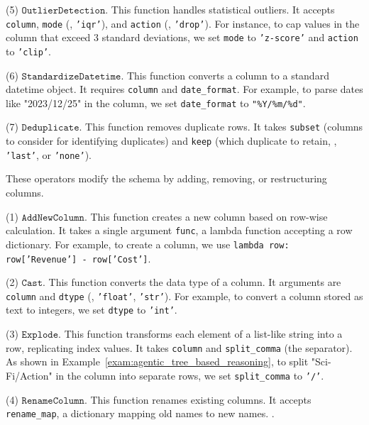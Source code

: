 (5) $\mathtt{OutlierDetection}$.
    This function handles statistical outliers. It accepts {\small\texttt{column}}, {\small\texttt{mode}} (, {\small\texttt{'iqr'}}), and {\small\texttt{action}} (, {\small\texttt{'drop'}}). For instance, to cap values in the  column that exceed 3 standard deviations, we set {\small\texttt{mode}} to {\small\texttt{'z-score'}} and {\small\texttt{action}} to {\small\texttt{'clip'}}.

(6) $\mathtt{StandardizeDatetime}$.
    This function converts a column to a standard datetime object. It requires {\small\texttt{column}} and {\small\texttt{date\_format}}. For example, to parse dates like "2023/12/25" in the  column, we set {\small\texttt{date\_format}} to {\small\texttt{"\%Y/\%m/\%d"}}.

(7) $\mathtt{Deduplicate}$.
    This function removes duplicate rows. It takes {\small\texttt{subset}} (columns to consider for identifying duplicates) and {\small\texttt{keep}} (which duplicate to retain, , {\small\texttt{'last'}}, or {\small\texttt{'none'}}).

These operators modify the schema by adding, removing, or restructuring columns.

(1) $\mathtt{AddNewColumn}$.
    This function creates a new column based on row-wise calculation. It takes a single argument {\small\texttt{func}}, a lambda function accepting a row dictionary. For example, to create a  column, we use {\small\texttt{lambda row: row['Revenue'] - row['Cost']}}.

(2) $\mathtt{Cast}$.
    This function converts the data type of a column. It arguments are {\small\texttt{column}} and {\small\texttt{dtype}} (, {\small\texttt{'float'}}, {\small\texttt{'str'}}). For example, to convert a  column stored as text to integers, we set {\small\texttt{dtype}} to {\small\texttt{'int'}}.

(3) $\mathtt{Explode}$.
    This function transforms each element of a list-like string into a row, replicating index values. It takes {\small\texttt{column}} and {\small\texttt{split\_comma}} (the separator). As shown in Example~\ref{exam:agentic_tree_based_reasoning}, to split "Sci-Fi/Action" in the  column into separate rows, we set {\small\texttt{split\_comma}} to {\small\texttt{'/'}}.

(4) $\mathtt{RenameColumn}$.
    This function renames existing columns. It accepts {\small\texttt{rename\_map}}, a dictionary mapping old names to new names. .

